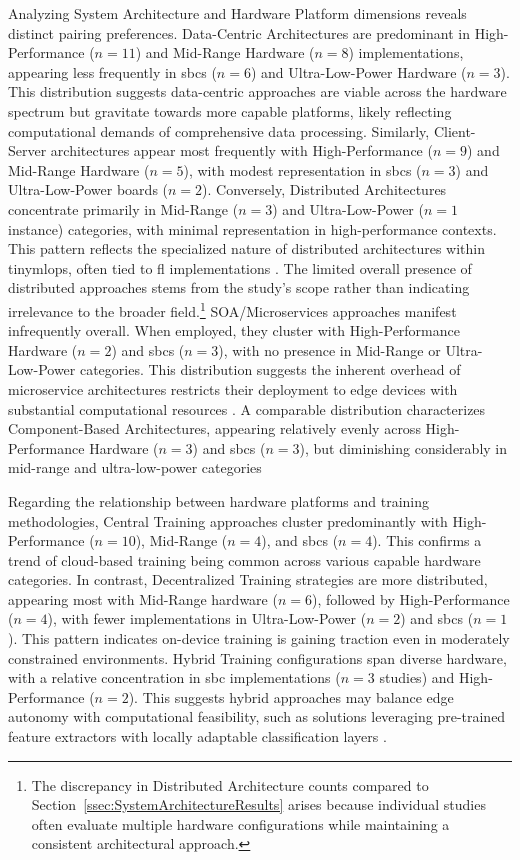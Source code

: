 Analyzing System Architecture and Hardware Platform dimensions reveals distinct pairing preferences. Data-Centric Architectures are predominant in High-Performance ($n=11$) and Mid-Range Hardware ($n=8$) implementations, appearing less frequently in \glspl{sbc} ($n=6$) and Ultra-Low-Power Hardware ($n=3$). This distribution suggests data-centric approaches are viable across the hardware spectrum but gravitate towards more capable platforms, likely reflecting computational demands of comprehensive data processing.
Similarly, Client-Server architectures appear most frequently with High-Performance ($n=9$) and Mid-Range Hardware ($n=5$), with modest representation in \glspl{sbc} ($n=3$) and Ultra-Low-Power boards ($n=2$).
Conversely, Distributed Architectures concentrate primarily in Mid-Range ($n=3$) and Ultra-Low-Power ($n=1$ instance) categories, with minimal representation in high-performance contexts. This pattern reflects the specialized nature of distributed architectures within \gls{tinymlops}, often tied to \gls{fl} implementations \cite{grauOnDeviceTrainingMachine2021}. The limited overall presence of distributed approaches stems from the study's scope rather than indicating irrelevance to the broader field.\footnote{The discrepancy in Distributed Architecture counts compared to Section~\ref{ssec:SystemArchitectureResults} arises because individual studies often evaluate multiple hardware configurations while maintaining a consistent architectural approach.}
SOA/Microservices approaches manifest infrequently overall. When employed, they cluster with High-Performance Hardware ($n=2$) and \glspl{sbc} ($n=3$), with no presence in Mid-Range or Ultra-Low-Power categories. This distribution suggests the inherent overhead of microservice architectures restricts their deployment to edge devices with substantial computational resources \cite{rajEdgeMLOpsAutomation2021}. A comparable distribution characterizes Component-Based Architectures, appearing relatively evenly across High-Performance Hardware ($n=3$) and \glspl{sbc} ($n=3$), but diminishing considerably in mid-range and ultra-low-power categories

Regarding the relationship between hardware platforms and training methodologies, Central Training approaches cluster predominantly with High-Performance ($n=10$), Mid-Range ($n=4$), and \glspl{sbc} ($n=4$). This confirms a trend of cloud-based training being common across various capable hardware categories.
In contrast, Decentralized Training strategies are more distributed, appearing most with Mid-Range hardware ($n=6$), followed by High-Performance ($n=4$), with fewer implementations in Ultra-Low-Power ($n=2$) and \glspl{sbc} ($n=1$). This pattern indicates on-device training is gaining traction even in moderately constrained environments.
Hybrid Training configurations span diverse hardware, with a relative concentration in \gls{sbc} implementations ($n=3$ studies) and High-Performance ($n=2$). This suggests hybrid approaches may balance edge autonomy with computational feasibility, such as solutions leveraging pre-trained feature extractors with locally adaptable classification layers \cite{disabatoIncrementalOnDeviceTiny2020}.

